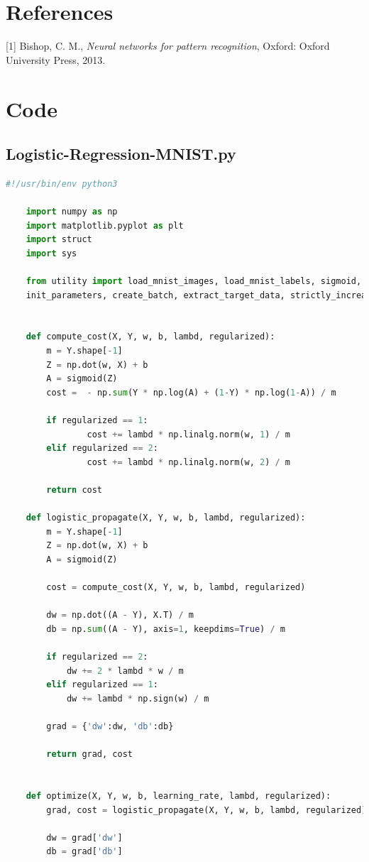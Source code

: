 \documentclass{article}
\begin{document}
\section{References}
[1] Bishop, C. M., {\it Neural networks for pattern recognition}, Oxford: Oxford University Press, 2013.

\newpage
\section{Code}
\subsection{Logistic-Regression-MNIST.py}
\begin{lstlisting}[language=Python, breaklines]
	#!/usr/bin/env python3
	
	import numpy as np
	import matplotlib.pyplot as plt
	import struct
	import sys
	
	from utility import load_mnist_images, load_mnist_labels, sigmoid, \
	init_parameters, create_batch, extract_target_data, strictly_increasing
	
	
	def compute_cost(X, Y, w, b, lambd, regularized):
	    m = Y.shape[-1]
	    Z = np.dot(w, X) + b
	    A = sigmoid(Z)
	    cost =  - np.sum(Y * np.log(A) + (1-Y) * np.log(1-A)) / m
	
	    if regularized == 1:
	            cost += lambd * np.linalg.norm(w, 1) / m
	    elif regularized == 2:
	            cost += lambd * np.linalg.norm(w, 2) / m
	
	    return cost
	
	def logistic_propagate(X, Y, w, b, lambd, regularized):
	    m = Y.shape[-1]
	    Z = np.dot(w, X) + b
	    A = sigmoid(Z)
	
	    cost = compute_cost(X, Y, w, b, lambd, regularized)
	
	    dw = np.dot((A - Y), X.T) / m
	    db = np.sum((A - Y), axis=1, keepdims=True) / m
	
	    if regularized == 2:
	        dw += 2 * lambd * w / m
	    elif regularized == 1:
	        dw += lambd * np.sign(w) / m
	
	    grad = {'dw':dw, 'db':db}
	
	    return grad, cost
	
	
	def optimize(X, Y, w, b, learning_rate, lambd, regularized):
	    grad, cost = logistic_propagate(X, Y, w, b, lambd, regularized)
	
	    dw = grad['dw']
	    db = grad['db']
	

\end{lstlisting}
\end{document}

